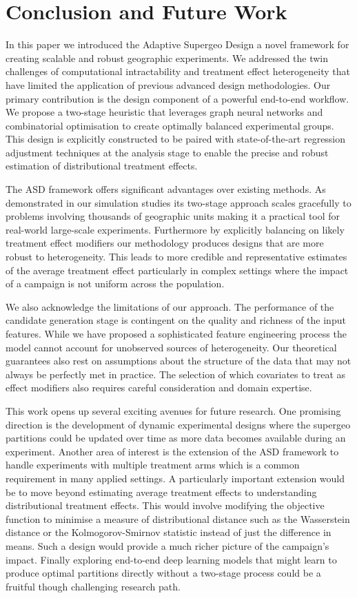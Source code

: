 \documentclass[final,3p,fleqn, 10pt]{elsarticle}
\begin{document}
\section{Conclusion and Future Work}
\label{sec:conclusion}
In this paper we introduced the Adaptive Supergeo Design a novel framework for creating scalable and robust geographic experiments. We addressed the twin challenges of computational intractability and treatment effect heterogeneity that have limited the application of previous advanced design methodologies. Our primary contribution is the design component of a powerful end-to-end workflow. We propose a two-stage heuristic that leverages graph neural networks and combinatorial optimisation to create optimally balanced experimental groups. This design is explicitly constructed to be paired with state-of-the-art regression adjustment techniques at the analysis stage to enable the precise and robust estimation of distributional treatment effects.

The ASD framework offers significant advantages over existing methods. As demonstrated in our simulation studies its two-stage approach scales gracefully to problems involving thousands of geographic units making it a practical tool for real-world large-scale experiments. Furthermore by explicitly balancing on likely treatment effect modifiers our methodology produces designs that are more robust to heterogeneity. This leads to more credible and representative estimates of the average treatment effect particularly in complex settings where the impact of a campaign is not uniform across the population.

We also acknowledge the limitations of our approach. The performance of the candidate generation stage is contingent on the quality and richness of the input features. While we have proposed a sophisticated feature engineering process the model cannot account for unobserved sources of heterogeneity. Our theoretical guarantees also rest on assumptions about the structure of the data that may not always be perfectly met in practice. The selection of which covariates to treat as effect modifiers also requires careful consideration and domain expertise.

This work opens up several exciting avenues for future research. One promising direction is the development of dynamic experimental designs where the supergeo partitions could be updated over time as more data becomes available during an experiment. Another area of interest is the extension of the ASD framework to handle experiments with multiple treatment arms which is a common requirement in many applied settings. A particularly important extension would be to move beyond estimating average treatment effects to understanding distributional treatment effects. This would involve modifying the objective function to minimise a measure of distributional distance such as the Wasserstein distance or the Kolmogorov-Smirnov statistic instead of just the difference in means. Such a design would provide a much richer picture of the campaign's impact. Finally exploring end-to-end deep learning models that might learn to produce optimal partitions directly without a two-stage process could be a fruitful though challenging research path.
\end{document}
